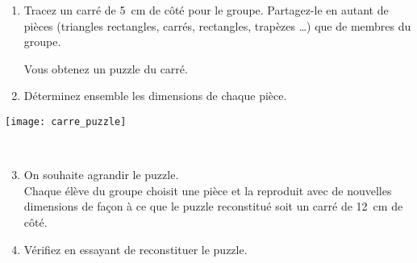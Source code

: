 
\begin{TP}

\begin{minipage}[c]{0.48\linewidth}
\begin{enumerate}
 \item Tracez un carré de 5 cm de côté pour le groupe. Partagez-le en autant de pièces (triangles rectangles, carrés, rectangles, trapèzes \ldots) que de membres du groupe.
 
Vous obtenez un puzzle du carré.
 \item Déterminez ensemble les dimensions de chaque pièce.
 \end{enumerate}
\end{minipage} \hfill%
 \begin{minipage}[c]{0.4\linewidth}
\texttt{[image: carre\_puzzle]}
 \end{minipage} \\

\begin{enumerate}
 \setcounter{enumi}{2}
 \item On souhaite agrandir le puzzle. \\[0.5em]
Chaque élève du groupe choisit une pièce et la reproduit avec de nouvelles dimensions de façon à ce que le puzzle reconstitué soit un carré de 12 cm de côté.
 \end{enumerate}

\begin{enumerate}
 \setcounter{enumi}{3}
 \item Vérifiez en essayant de reconstituer le puzzle.
 \end{enumerate}

\end{TP}

